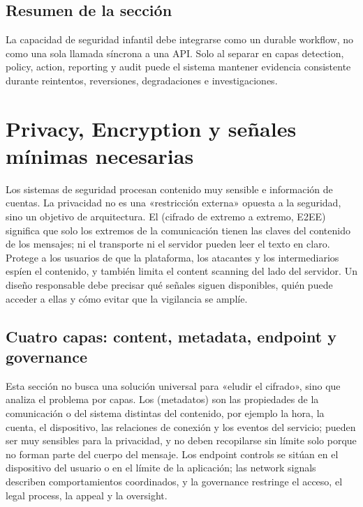 \documentclass[a4paper]{article}
\begin{document}

\subsection{Resumen de la sección}

La capacidad de seguridad infantil debe integrarse como un durable workflow, no como una sola llamada síncrona a una API. Solo al separar en capas detection, policy, action, reporting y audit puede el sistema mantener evidencia consistente durante reintentos, reversiones, degradaciones e investigaciones.
\section{Privacy, Encryption y señales mínimas necesarias}

Los sistemas de seguridad procesan contenido muy sensible e información de cuentas. La privacidad no es una «restricción externa» opuesta a la seguridad, sino un objetivo de arquitectura. El  (cifrado de extremo a extremo, E2EE) significa que solo los extremos de la comunicación tienen las claves del contenido de los mensajes; ni el transporte ni el servidor pueden leer el texto en claro. Protege a los usuarios de que la plataforma, los atacantes y los intermediarios espíen el contenido, y también limita el content scanning del lado del servidor. Un diseño responsable debe precisar qué señales siguen disponibles, quién puede acceder a ellas y cómo evitar que la vigilancia se amplíe.

\subsection{Cuatro capas: content, metadata, endpoint y governance}

Esta sección no busca una solución universal para «eludir el cifrado», sino que analiza el problema por capas. Los  (metadatos) son las propiedades de la comunicación o del sistema distintas del contenido, por ejemplo la hora, la cuenta, el dispositivo, las relaciones de conexión y los eventos del servicio; pueden ser muy sensibles para la privacidad, y no deben recopilarse sin límite solo porque no forman parte del cuerpo del mensaje. Los endpoint controls se sitúan en el dispositivo del usuario o en el límite de la aplicación; las network signals describen comportamientos coordinados, y la governance restringe el acceso, el legal process, la appeal y la oversight.
\end{document}
